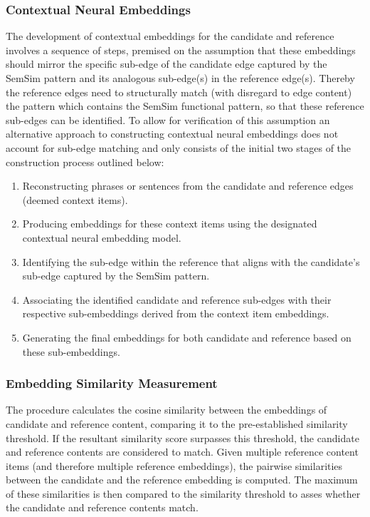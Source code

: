\documentclass[11pt]{scrreprt}
\begin{document}
\subsubsection{Contextual Neural Embeddings}
The development of contextual embeddings for the candidate and reference involves a sequence of steps, premised on the assumption that these embeddings should mirror the specific sub-edge of the candidate edge captured by the SemSim pattern and its analogous sub-edge(s) in the reference edge(s). Thereby the reference edges need to structurally match (with disregard to edge content) the pattern which contains the SemSim functional pattern, so that these reference sub-edges can be identified. To allow for verification of this assumption an alternative approach to constructing contextual neural embeddings does not account for sub-edge matching and only consists of the initial two stages of the construction process outlined below:

\begin{enumerate}
	\item Reconstructing phrases or sentences from the candidate and reference edges (deemed context items).
    \item Producing embeddings for these context items using the designated contextual neural embedding model.
    \item Identifying the sub-edge within the reference that aligns with the candidate's sub-edge captured by the SemSim pattern.
    \item Associating the identified candidate and reference sub-edges with their respective sub-embeddings derived from the context item embeddings.
    \item Generating the final embeddings for both candidate and reference based on these sub-embeddings.
\end{enumerate}
    
\subsubsection{Embedding Similarity Measurement}
The procedure calculates the cosine similarity between the embeddings of candidate and reference content, comparing it to the pre-established similarity threshold. If the resultant similarity score surpasses this threshold, the candidate and reference contents are considered to match. Given multiple reference content items (and therefore multiple reference embeddings), the pairwise similarities between the candidate and the reference embedding is computed. The maximum of these similarities is then compared to the similarity threshold to asses whether the candidate and reference contents match.
\end{document}
